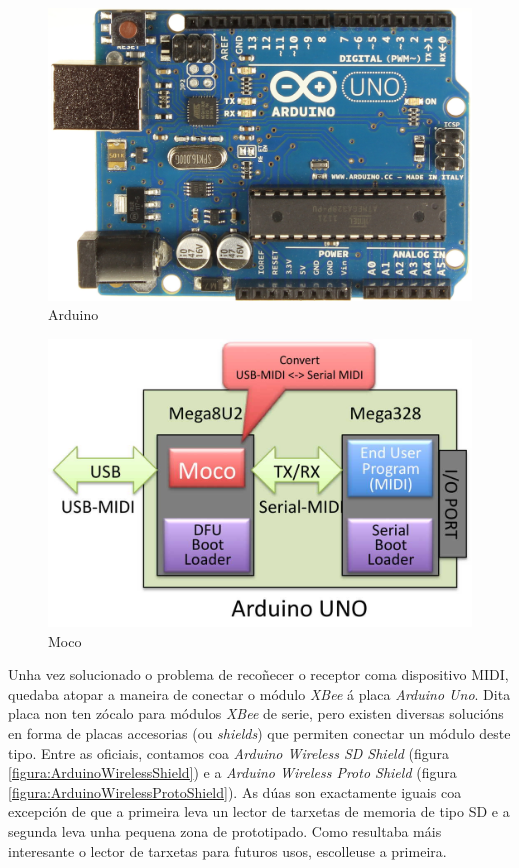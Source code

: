   \begin{figure}[htbp]
   \centering
   \includegraphics[scale=0.1,keepaspectratio=true]{./imagenes/arduino.jpg}
   \caption{Arduino}
   \label{figura:ArduinoUno}
  \end{figure}

  \begin{figure}[htbp]
   \centering
   \includegraphics[scale=0.3,keepaspectratio=true]{./imagenes/moco.jpg}
   \caption{Moco}
   \label{figura:Moco}
  \end{figure}

  Unha vez solucionado o problema de recoñecer o receptor coma dispositivo
  MIDI, quedaba atopar a maneira de conectar o módulo \textit{XBee} á placa
  \textit{Arduino Uno}. Dita placa non ten zócalo para módulos \textit{XBee}
  de serie, pero existen diversas solucións en forma de placas accesorias (ou
  \textit{shields}) que permiten conectar un módulo deste tipo. Entre as
  oficiais, contamos coa \textit{Arduino Wireless SD Shield}
  \cite{ArduinoWirelessShield} (figura \ref{figura:ArduinoWirelessShield}) e a
  \textit{Arduino Wireless Proto Shield} \cite{ArduinoWirelessProtoShield}
  (figura \ref{figura:ArduinoWirelessProtoShield}). As dúas son exactamente
  iguais coa excepción de que a primeira leva un lector de tarxetas de memoria
  de tipo SD e a segunda leva unha pequena zona de prototipado. Como resultaba
  máis interesante o lector de tarxetas para futuros usos, escolleuse a
  primeira.

